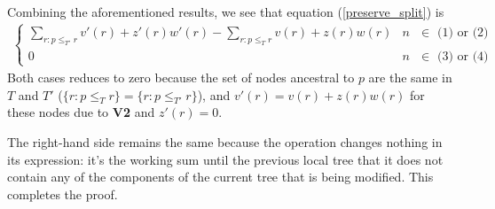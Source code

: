 Combining the aforementioned results, we see that equation (\ref{preserve_split}) is 
\begin{align}
    \begin{cases}
        \sum_{r: p \le_{T'} r} v'(r) + z'(r)w'(r) - \sum_{r: p \le_{T} r} v(r) + z(r)w(r) & \text{$n$ $\in$ (1) or (2)} \\
        0 & \text{$n$ $\in$ (3) or (4)}
    \end{cases} 
\end{align}
Both cases reduces to zero because the set of nodes ancestral to $p$ are the same in $T$ and $T'$ ($\{r: p \le_T r\}=\{r: p \le_{T'} r\}$), 
 and $v'(r) = v(r) + z(r)w(r)$ for these nodes due to \textbf{V2} and $z'(r)=0$. 

The right-hand side remains the same because the operation changes nothing in its expression:
it's the working sum until the previous local tree that it does not contain any of 
the components of the current tree that is being modified.
This completes the proof.




